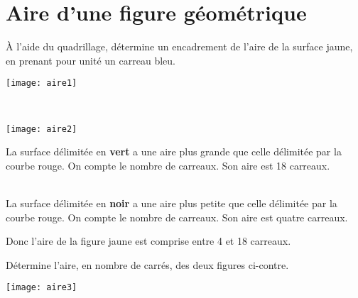\section{Aire d'une figure géométrique} 


\begin{methode*1}

\begin{exemple*1}
\begin{minipage}[c]{0.55\textwidth}
 À l'aide du quadrillage, détermine un encadrement de l'aire de la surface jaune, en prenant pour unité un carreau bleu.
 \end{minipage} \hfill%
 \begin{minipage}[c]{0.2\textwidth}
 \texttt{[image: aire1]}
 \end{minipage} \\
 
 \begin{minipage}[c]{0.1\textwidth}
  \texttt{[image: aire2]}
 \end{minipage} \hfill%
 \begin{minipage}[c]{0.7\textwidth}
La surface délimitée en \textbf{\textcolor{H1}{vert}} a une aire plus grande que celle délimitée par la courbe rouge. On compte le nombre de carreaux. Son aire est 18 carreaux.
 \end{minipage} \\[1em]
La surface délimitée en \textbf{noir} a une aire plus petite que celle délimitée par la courbe rouge. On compte le nombre de carreaux. Son aire est quatre carreaux.

Donc l'aire de la figure jaune est comprise entre 4 et 18 carreaux.

\end{exemple*1}

\exercice 
\begin{minipage}[c]{0.50\textwidth}
 Détermine l'aire, en nombre de carrés, des deux figures ci-contre.
 \end{minipage} \hfill%
 \begin{minipage}[c]{0.16\textwidth}
 \texttt{[image: aire3]}
 \end{minipage} \\
 
\end{methode*1}

